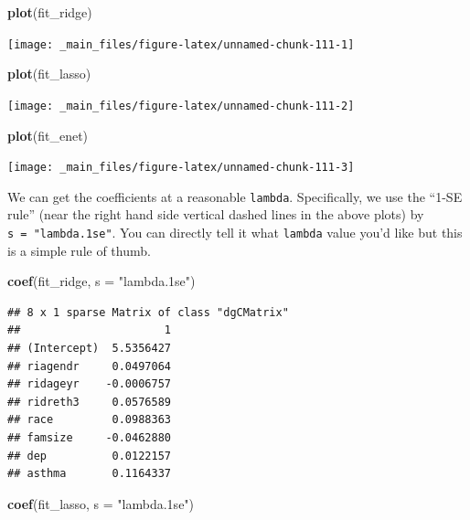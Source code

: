 \documentclass[]{tufte-book}
\newenvironment{Shaded}{}{}
\newcommand{\KeywordTok}[1]{\textcolor[rgb]{0.00,0.44,0.13}{\textbf{#1}}}
\newcommand{\DataTypeTok}[1]{\textcolor[rgb]{0.56,0.13,0.00}{#1}}
\newcommand{\StringTok}[1]{\textcolor[rgb]{0.25,0.44,0.63}{#1}}
\newcommand{\NormalTok}[1]{#1}
\theoremstyle{definition}
\theoremstyle{definition}
\theoremstyle{remark}
\begin{document}
\begin{Shaded}
\begin{Highlighting}[]
\KeywordTok{plot}\NormalTok{(fit_ridge)}
\end{Highlighting}
\end{Shaded}

\texttt{[image: \_main\_files/figure-latex/unnamed-chunk-111-1]}

\begin{Shaded}
\begin{Highlighting}[]
\KeywordTok{plot}\NormalTok{(fit_lasso)}
\end{Highlighting}
\end{Shaded}

\texttt{[image: \_main\_files/figure-latex/unnamed-chunk-111-2]}

\begin{Shaded}
\begin{Highlighting}[]
\KeywordTok{plot}\NormalTok{(fit_enet)}
\end{Highlighting}
\end{Shaded}

\texttt{[image: \_main\_files/figure-latex/unnamed-chunk-111-3]}

We can get the coefficients at a reasonable \texttt{lambda}.
Specifically, we use the ``1-SE rule'' (near the right hand side
vertical dashed lines in the above plots) by
\texttt{s\ =\ "lambda.1se"}. You can directly tell it what
\texttt{lambda} value you'd like but this is a simple rule of thumb.

\begin{Shaded}
\begin{Highlighting}[]
\KeywordTok{coef}\NormalTok{(fit_ridge, }\DataTypeTok{s =} \StringTok{"lambda.1se"}\NormalTok{)}
\end{Highlighting}
\end{Shaded}

\begin{verbatim}
## 8 x 1 sparse Matrix of class "dgCMatrix"
##                      1
## (Intercept)  5.5356427
## riagendr     0.0497064
## ridageyr    -0.0006757
## ridreth3     0.0576589
## race         0.0988363
## famsize     -0.0462880
## dep          0.0122157
## asthma       0.1164337
\end{verbatim}

\begin{Shaded}
\begin{Highlighting}[]
\KeywordTok{coef}\NormalTok{(fit_lasso, }\DataTypeTok{s =} \StringTok{"lambda.1se"}\NormalTok{)}
\end{Highlighting}
\end{Shaded}
\end{document}
